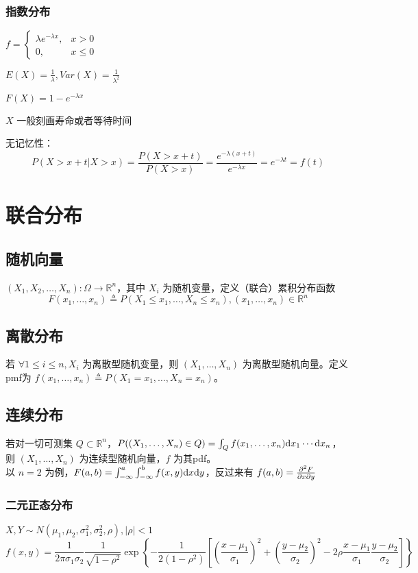 \documentclass[./main.tex]{subfiles}
\begin{document}
\subsubsection{指数分布}
\begin{itemize*}
    \item $f=\begin{cases}\lambda e^{-\lambda x},&x>0\\0,&x\le 0\end{cases}$
    \item $E(X)=\frac{1}{\lambda},Var(X)=\frac{1}{\lambda^2}$
    \item $F(X)=1-e^{-\lambda x}$
    \item $X$ 一般刻画寿命或者等待时间
    \item 无记忆性：$$P(X>x+t|X>x)=\frac{P(X>x+t)}{P(X>x)}=\frac{e^{-\lambda(x+t)}}{e^{-\lambda x}}=e^{-\lambda t}=f(t)$$
\end{itemize*}
\section{联合分布}
\subsection{随机向量}
$(X_1,X_2,\dots,X_n):\Omega\rightarrow\mathbb{R}^n$，其中 $X_i$ 为随机变量，定义（联合）累积分布函数
$$F(x_1,\dots,x_n)\triangleq P(X_1\le x_1,\dots,X_n\le x_n),(x_1,\dots,x_n)\in\mathbb{R}^n$$
\subsection{离散分布}
若 $\forall 1\le i\le n,X_i$ 为离散型随机变量，则 $(X_1,\dots,X_n)$ 为离散型随机向量。定义pmf为 $f(x_1,\dots,x_n)\triangleq P(X_1=x_1,\dots,X_n=x_n)$。
\subsection{连续分布}
若对一切可测集 $Q\subset\mathbb{R}^n$，$P((X_1,\dots,X_n)\in Q)=\int_Qf(x_1,\dots,x_n)\text{d}x_1\cdots\text{d}x_n$，则 $(X_1,\dots,X_n)$ 为连续型随机向量，$f$ 为其pdf。\\
\indent 以 $n=2$ 为例，$F(a,b)=\int_{-\infty}^a\int_{-\infty}^bf(x,y)\text{d}x\text{d}y$，反过来有 $f(a,b)=\frac{\partial^2F}{\partial x\partial y}$
\subsubsection{二元正态分布}
$X,Y\sim N(\mu_1,\mu_2,\sigma_1^2,\sigma_2^2,\rho),|\rho|<1$
\begin{equation}
    f(x,y)=\frac{1}{2\pi\sigma_1\sigma_2}\frac{1}{\sqrt{1-\rho^2}}\exp\left\{-\frac{1}{2(1-\rho^2)}\left[\left(\frac{x-\mu_1}{\sigma_1}\right)^2+\left(\frac{y-\mu_2}{\sigma_2}\right)^2-2\rho\frac{x-\mu_1}{\sigma_1}\frac{y-\mu_2}{\sigma_2}\right]\right\}
\end{equation}
\end{document}
